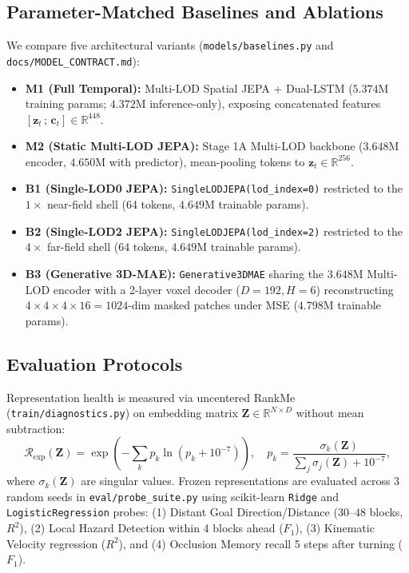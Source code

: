 \documentclass[runningheads]{llncs}
\begin{document}
\subsection{Parameter-Matched Baselines and Ablations}
We compare five architectural variants (\texttt{models/baselines.py} and \texttt{docs/MODEL\_CONTRACT.md}):
\begin{itemize}
    \item \textbf{M1 (Full Temporal):} Multi-LOD Spatial JEPA + Dual-LSTM ($5.374\text{M}$ training params; $4.372\text{M}$ inference-only), exposing concatenated features $[\mathbf{z}_t\,;\,\mathbf{c}_t] \in \mathbb{R}^{448}$.
    \item \textbf{M2 (Static Multi-LOD JEPA):} Stage 1A Multi-LOD backbone ($3.648\text{M}$ encoder, $4.650\text{M}$ with predictor), mean-pooling tokens to $\mathbf{z}_t \in \mathbb{R}^{256}$.
    \item \textbf{B1 (Single-LOD0 JEPA):} \texttt{SingleLODJEPA(lod\_index=0)} restricted to the $1\times$ near-field shell (64 tokens, $4.649\text{M}$ trainable params).
    \item \textbf{B2 (Single-LOD2 JEPA):} \texttt{SingleLODJEPA(lod\_index=2)} restricted to the $4\times$ far-field shell (64 tokens, $4.649\text{M}$ trainable params).
    \item \textbf{B3 (Generative 3D-MAE):} \texttt{Generative3DMAE} sharing the $3.648\text{M}$ Multi-LOD encoder with a 2-layer voxel decoder ($D=192, H=6$) reconstructing $4\times4\times4\times16 = 1024$-dim masked patches under MSE ($4.798\text{M}$ trainable params).
\end{itemize}

\subsection{Evaluation Protocols}
Representation health is measured via uncentered RankMe~\cite{garrido2023rankme} (\texttt{train/diagnostics.py}) on embedding matrix $\mathbf{Z} \in \mathbb{R}^{N \times D}$ without mean subtraction:
\begin{equation}
\mathcal{R}_{\text{exp}}(\mathbf{Z}) = \exp\left(-\sum_k p_k \ln\left(p_k + 10^{-7}\right)\right), \quad p_k = \frac{\sigma_k(\mathbf{Z})}{\sum_j \sigma_j(\mathbf{Z}) + 10^{-7}},
\end{equation}
where $\sigma_k(\mathbf{Z})$ are singular values. Frozen representations are evaluated across 3 random seeds in \texttt{eval/probe\_suite.py} using scikit-learn \texttt{Ridge} and \texttt{LogisticRegression} probes: (1) Distant Goal Direction/Distance ($30\text{--}48$ blocks, $R^2$), (2) Local Hazard Detection within 4 blocks ahead ($F_1$), (3) Kinematic Velocity regression ($R^2$), and (4) Occlusion Memory recall 5 steps after turning ($F_1$).
\end{document}
